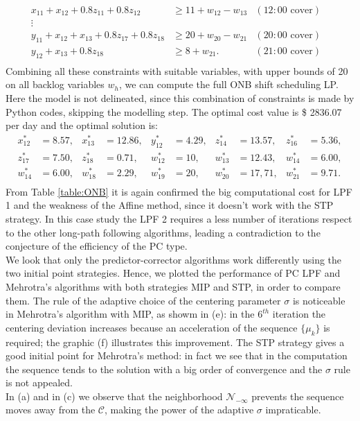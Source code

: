 \documentclass[a4paper,10 pt,titlepage,twoside]{book}
\theoremstyle{plain}
\theoremstyle{definition}
\theoremstyle{remark}
\begin{document}
{{\begin{align*}
x_{11}+x_{12}+0.8z_{11}+0.8z_{12}&\geq11 +w_{12}-w_{13}&(12:00 \text{ cover})&\\
\vdots&&&\\
y_{11}+x_{12}+x_{13}+0.8z_{17}+0.8z_{18}&\geq 20 +w_{20}-w_{21}&(20:00 \text{ cover})&\\
y_{12}+x_{13}+0.8z_{18}&\geq 8 +w_{21}.&(21:00 \text{ cover})&\\
\end{align*}
Combining all these constraints with suitable variables, with upper bounds of 20 on all backlog variables $w_{h}$, we can compute the full ONB shift scheduling LP. Here the model is not delineated, since this combination of constraints is made by Python codes, skipping the modelling step. The optimal cost value is \$ 2836.07 per day and the optimal solution is:
\begin{align*}
x_{12}^{*} &=  8.57, & x_{13}^{*}&=  12.86, & y_{12}^{*} &= 4.29, & z_{14}^{*} &= 13.57, &z_{16}^{*} &= 5.36,\\
z_{17}^{*} &= 7.50, & z_{18}^{*}&= 0.71,  & w_{12}^{*} &= 10, & w_{13}^{*} &= 12.43, &w_{14}^{*} &=  6.00,\\
w_{14}^{*} &=  6.00, & w_{18}^{*}&=  2.29, & w_{19}^{*} &= 20, & w_{20}^{*} &= 17,71, &w_{21}^{*} &= 9.71.\\
\end{align*}
From Table \ref{table:ONB} it is again confirmed the big computational cost for LPF 1 and the weakness of the Affine method, since it doesn't work with the STP strategy. In this case study the LPF 2 requires a less number of iterations respect to the other long-path following algorithms, leading a contradiction to the conjecture of the efficiency of the PC type.\\ 
We look that only the predictor-corrector algorithms work differently using the two initial point strategies.
Hence, we plotted the performance of PC LPF and Mehrotra's algorithms with both strategies MIP and STP, in order to compare them. The rule of the adaptive choice of the centering parameter $\sigma$ is noticeable in Mehrotra's algorithm with MIP, as showm in (e): in the $6^{th}$ iteration the centering deviation increases because an acceleration of the sequence $\{\mu_{k}\}$ is required; the graphic (f) illustrates this improvement. The STP strategy gives a good initial point for Mehrotra's method: in fact we see that in the computation the sequence tends to the solution with a big order of convergence and the $\sigma$ rule is not appealed.\\
In (a) and in (c) we observe that the neighborhood $\mathcal{N}_{-\infty}$ prevents the sequence moves away from the $\mathcal{C}$, making the power of the adaptive $\sigma$ impraticable.\\  

}}
\end{document}
